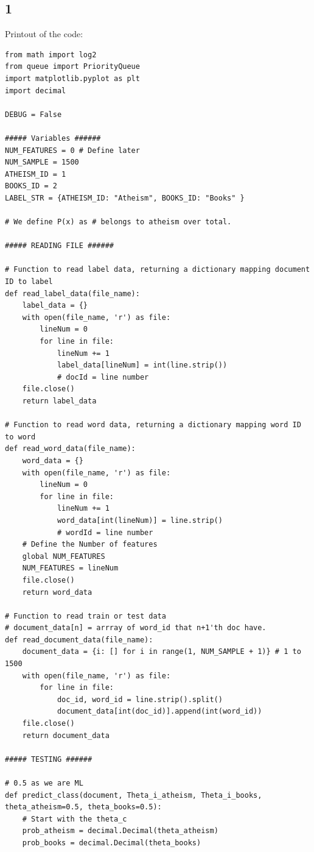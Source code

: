 \documentclass[12pt]{article}
\begin{document}
\subsection{} 
\begin{enumerate}
\part{1} Printout of the code:

\begin{lstlisting}
from math import log2
from queue import PriorityQueue
import matplotlib.pyplot as plt
import decimal

DEBUG = False

##### Variables ######
NUM_FEATURES = 0 # Define later
NUM_SAMPLE = 1500
ATHEISM_ID = 1
BOOKS_ID = 2
LABEL_STR = {ATHEISM_ID: "Atheism", BOOKS_ID: "Books" }

# We define P(x) as # belongs to atheism over total.

##### READING FILE ######

# Function to read label data, returning a dictionary mapping document ID to label
def read_label_data(file_name):
    label_data = {}
    with open(file_name, 'r') as file:
        lineNum = 0
        for line in file:
            lineNum += 1
            label_data[lineNum] = int(line.strip())
            # docId = line number
    file.close()
    return label_data

# Function to read word data, returning a dictionary mapping word ID to word
def read_word_data(file_name):
    word_data = {}
    with open(file_name, 'r') as file:
        lineNum = 0
        for line in file:
            lineNum += 1
            word_data[int(lineNum)] = line.strip()
            # wordId = line number
    # Define the Number of features
    global NUM_FEATURES
    NUM_FEATURES = lineNum
    file.close()
    return word_data

# Function to read train or test data
# document_data[n] = arrray of word_id that n+1'th doc have.
def read_document_data(file_name):
    document_data = {i: [] for i in range(1, NUM_SAMPLE + 1)} # 1 to 1500 
    with open(file_name, 'r') as file:
        for line in file:
            doc_id, word_id = line.strip().split()
            document_data[int(doc_id)].append(int(word_id))
    file.close()
    return document_data
    
##### TESTING ######

# 0.5 as we are ML
def predict_class(document, Theta_i_atheism, Theta_i_books, theta_atheism=0.5, theta_books=0.5):
    # Start with the theta_c
    prob_atheism = decimal.Decimal(theta_atheism)
    prob_books = decimal.Decimal(theta_books)
    

\end{lstlisting}
\end{enumerate}
\end{document}
